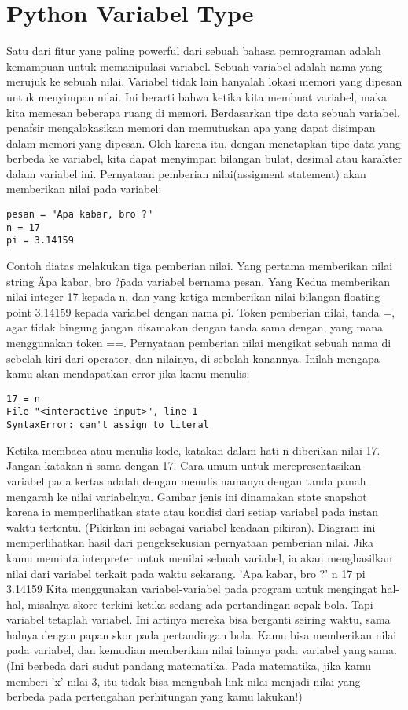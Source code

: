 \section{Python Variabel Type}
Satu dari fitur yang paling powerful dari sebuah bahasa pemrograman adalah kemampuan untuk memanipulasi variabel. Sebuah variabel adalah nama yang merujuk ke sebuah nilai. Variabel tidak lain hanyalah lokasi memori yang dipesan untuk menyimpan nilai. Ini berarti bahwa ketika kita membuat variabel, maka kita memesan beberapa ruang di memori. Berdasarkan tipe data sebuah variabel, penafsir mengalokasikan memori dan memutuskan apa yang dapat disimpan dalam memori yang dipesan. Oleh karena itu, dengan menetapkan tipe data yang berbeda ke variabel, kita dapat menyimpan bilangan bulat, desimal atau karakter dalam variabel ini.
Pernyataan pemberian nilai(assigment statement) akan memberikan nilai pada variabel: 
\begin{verbatim}
pesan = "Apa kabar, bro ?" 
n = 17  
pi = 3.14159 
\end{verbatim}
Contoh diatas melakukan tiga pemberian nilai. Yang pertama memberikan nilai string \"Apa kabar, bro ?\" pada variabel bernama pesan. Yang Kedua memberikan nilai integer 17 kepada n, dan yang ketiga memberikan nilai bilangan floating-point 3.14159 kepada variabel dengan nama pi.
Token pemberian nilai, tanda =, agar tidak bingung jangan disamakan dengan tanda sama dengan, yang mana menggunakan token ==. Pernyataan pemberian nilai mengikat sebuah nama di sebelah kiri dari operator, dan nilainya, di sebelah kanannya. Inilah mengapa kamu akan mendapatkan error jika kamu menulis: 
\begin{verbatim}
17 = n 
File "<interactive input>", line 1 
SyntaxError: can't assign to literal 
\end{verbatim}
Ketika membaca atau menulis kode, katakan dalam hati \"n diberikan nilai 17\". Jangan katakan \"n sama dengan 17\".
Cara umum untuk merepresentasikan variabel pada kertas adalah dengan menulis namanya dengan tanda panah mengarah ke nilai variabelnya. Gambar jenis ini dinamakan state snapshot karena ia memperlihatkan state atau kondisi dari setiap variabel pada instan waktu tertentu. (Pikirkan ini sebagai variabel keadaan pikiran). Diagram ini memperlihatkan hasil dari pengeksekusian pernyataan pemberian nilai.
Jika kamu meminta interpreter untuk menilai sebuah variabel, ia akan menghasilkan nilai dari variabel terkait pada waktu sekarang.
'Apa kabar, bro ?' 
	n 
	17 
	pi  
	3.14159 
Kita menggunakan variabel-variabel pada program untuk mengingat hal-hal, misalnya skore terkini ketika sedang ada pertandingan sepak bola. Tapi variabel tetaplah variabel. Ini artinya mereka bisa berganti seiring waktu, sama halnya dengan papan skor pada pertandingan bola. Kamu bisa memberikan nilai pada variabel, dan kemudian memberikan nilai lainnya pada variabel yang sama. (Ini berbeda dari sudut pandang matematika. Pada matematika, jika kamu memberi 'x' nilai 3, itu tidak bisa mengubah link nilai menjadi nilai yang berbeda pada pertengahan perhitungan yang kamu lakukan!) 
